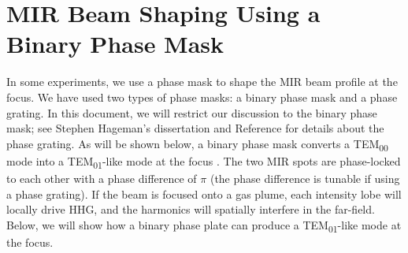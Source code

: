 \section{MIR Beam Shaping Using a Binary Phase Mask}
\label{sec:pi-plate-math}


In some experiments, we use a phase mask to shape the MIR beam profile at the focus. We have used two types of phase masks: a binary phase mask and a phase grating. In this document, we will restrict our discussion to the binary phase mask; see Stephen Hageman's dissertation \cite{hagemanComplexAttosecondTransient2020} and Reference \cite{camperHighRelativephasePrecision2019} for details about the phase grating. As will be shown below, a binary phase mask converts a TEM\textsubscript{00} mode into a TEM\textsubscript{01}-like mode at the focus \cite{hagemanComplexAttosecondTransient2020,camperHighRelativephasePrecision2019,camperTransverseElectromagneticMode2015,camperHighharmonicPhaseSpectroscopy2014,camperCombinedHighharmonicInterferometries2015}. The two MIR spots are phase-locked to each other with a phase difference of $\pi$ (the phase difference is tunable if using a phase grating). If the beam is focused onto a gas plume, each intensity lobe will locally drive HHG, and the harmonics will spatially interfere in the far-field. Below, we will show how a binary phase plate can produce a TEM\textsubscript{01}-like mode at the focus.

